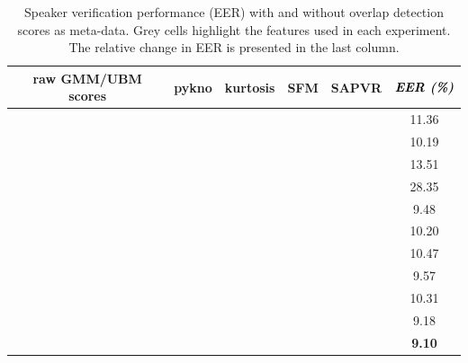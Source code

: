 \begin{table}[t]
	\centering
	\caption{ Speaker verification performance (EER) with and without overlap detection scores as meta-data. Grey cells highlight the features used in each experiment. The relative change in EER is presented in the last column.}
	\begin{tabular}{|c|c|c|c|c|c|}
		\hline
		raw GMM/UBM scores & pykno & kurtosis & SFM & SAPVR & $\textit{\textbf{EER (\%)}}$ \\ \hline
		\cellcolor[HTML]{C0C0C0}{\color[HTML]{343434} } \checkmark &  &  &  &  & 11.36\\ \hline \hline
		\cellcolor[HTML]{C0C0C0} \checkmark & \cellcolor[HTML]{C0C0C0} \checkmark &  &  &  & 10.19 \\ \hline
		\cellcolor[HTML]{C0C0C0} \checkmark &  & \cellcolor[HTML]{C0C0C0} \checkmark &  &  & 13.51 \\ \hline
		\cellcolor[HTML]{C0C0C0}{\color[HTML]{343434} } \checkmark &  &  & \cellcolor[HTML]{C0C0C0}{\color[HTML]{343434} } \checkmark &  & 28.35 \\ \hline
		\cellcolor[HTML]{C0C0C0} \checkmark &  &  &  & \cellcolor[HTML]{C0C0C0} \checkmark & 9.48 \\ \hline \hline
		\cellcolor[HTML]{C0C0C0}{\color[HTML]{343434} } \checkmark & \cellcolor[HTML]{C0C0C0} \checkmark & \cellcolor[HTML]{C0C0C0}{\color[HTML]{343434} } \checkmark &  &  & 10.20 \\ \hline
		\cellcolor[HTML]{C0C0C0} \checkmark & \cellcolor[HTML]{C0C0C0} \checkmark &  & \cellcolor[HTML]{C0C0C0} \checkmark &  & 10.47 \\ \hline
		\cellcolor[HTML]{C0C0C0} \checkmark & \cellcolor[HTML]{C0C0C0} \checkmark &  &  & \cellcolor[HTML]{C0C0C0} \checkmark & 9.57 \\ \hline \hline
		\cellcolor[HTML]{C0C0C0} \checkmark & \cellcolor[HTML]{C0C0C0} \checkmark & \cellcolor[HTML]{C0C0C0} \checkmark & \cellcolor[HTML]{C0C0C0} \checkmark &  & 10.31 \\ \hline
		\cellcolor[HTML]{C0C0C0} \checkmark & \cellcolor[HTML]{C0C0C0} \checkmark & \cellcolor[HTML]{C0C0C0} \checkmark & \cellcolor[HTML]{FFFFFF} & \cellcolor[HTML]{C0C0C0} \checkmark & 9.18 \\ \hline
		\cellcolor[HTML]{C0C0C0} \checkmark & \cellcolor[HTML]{C0C0C0} \checkmark & \cellcolor[HTML]{C0C0C0} \checkmark & \cellcolor[HTML]{C0C0C0} \checkmark & \cellcolor[HTML]{C0C0C0} \checkmark & {\bf 9.10}\\ \hline
	\end{tabular}
	\label{tab:ch3_sid_stack_results}
	\vspace{-5mm}
\end{table}

